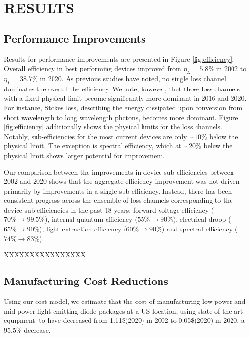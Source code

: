 \documentclass[a4paper,nocompress]{spie}  %
\begin{document}
\section{RESULTS}

\subsection{Performance Improvements}

     Results for performance improvements are presented in Figure \ref{fig:efficiency}. Overall efficiency in best performing devices improved from $\eta_L=5.8\%$ in 2002 to $\eta_L = 38.7\%$ in 2020. As previous studies have noted, no single loss channel dominates the overall the efficiency\cite{tsao2010solid}. We note, however, that those loss channels with a fixed physical limit become significantly more dominant in 2016 and 2020. For instance, Stokes loss, describing the energy dissipated upon conversion from short wavelength to long wavelength photons, becomes more dominant. Figure \ref{fig:efficiency} additionally shows the physical limits for the loss channels. Notably, sub-efficiencies for the most current devices are only $\sim10\%$ below the physical limit. The exception is spectral efficiency, which at $\sim20\%$ below the physical limit shows larger potential for improvement.
     
     Our comparison between the improvements in device sub-efficiencies between 2002 and 2020 shows that the aggregate efficiency improvement was not driven primarily by improvements in a single sub-efficiency. Instead, there has been consistent progress across the ensemble of loss channels corresponding to the device sub-efficiencies in the past 18 years: forward voltage efficiency ($70\%\rightarrow99.5\%$), internal quantum efficiency ($55\%\rightarrow90\%)$, electrical droop ($65\%\rightarrow90\%$), light-extraction efficiency ($60\%\rightarrow90\%$) and spectral efficiency ($74\% \rightarrow83\%$).
     
     XXXXXXXXXXXXXXXX

\subsection{Manufacturing Cost Reductions}

    Using our cost model, we estimate that the cost of manufacturing low-power and mid-power light-emitting diode packages at a US location, using state-of-the-art equipment, to have decreased from 1.11\$(2020) in 2002 to 0.05\$(2020) in 2020, a 95.5\% decrease. 
    
\end{document}
